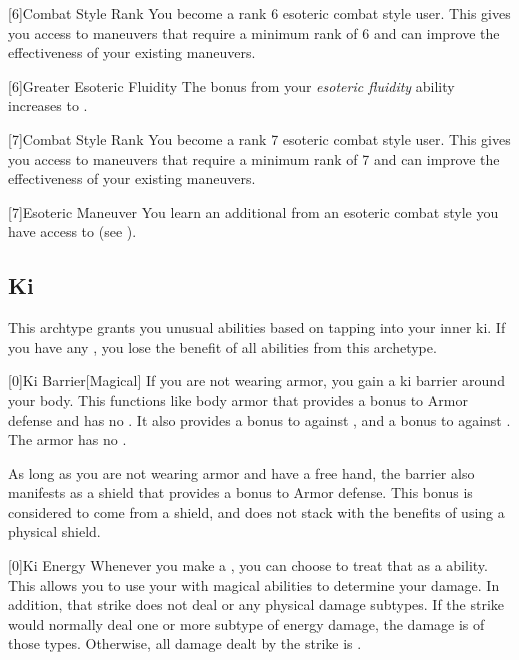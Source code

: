         {
            [6]{Combat Style Rank} You become a rank 6 esoteric combat style user.
            This gives you access to maneuvers that require a minimum rank of 6 and can improve the effectiveness of your existing maneuvers.

            [6]{Greater Esoteric Fluidity} The bonus from your \textit{esoteric fluidity} ability increases to .
        }

        {
            [7]{Combat Style Rank} You become a rank 7 esoteric combat style user.
            This gives you access to maneuvers that require a minimum rank of 7 and can improve the effectiveness of your existing maneuvers.

            [7]{Esoteric Maneuver}
            You learn an additional  from an esoteric combat style you have access to (see ).
        }

    \newpage
    \subsection{Ki}
        This archtype grants you unusual abilities based on tapping into your inner ki.
        If you have any , you lose the benefit of all abilities from this archetype.

        [0]{Ki Barrier}[Magical]
        If you are not wearing armor, you gain a ki barrier around your body.
        This functions like body armor that provides a  bonus to Armor defense and has no .
        It also provides a  bonus to  against , and a  bonus to  against .
        The armor has no .

        As long as you are not wearing armor and have a free hand, the barrier also manifests as a shield that provides a  bonus to Armor defense.
        This bonus is considered to come from a shield, and does not stack with the benefits of using a physical shield.

        [0]{Ki Energy} Whenever you make a , you can choose to treat that as a  ability.
        This allows you to use your  with magical abilities to determine your damage.
        In addition, that strike does not deal  or any physical damage subtypes.
        If the strike would normally deal one or more subtype of energy damage, the damage is of those types.
        Otherwise, all damage dealt by the strike is .

